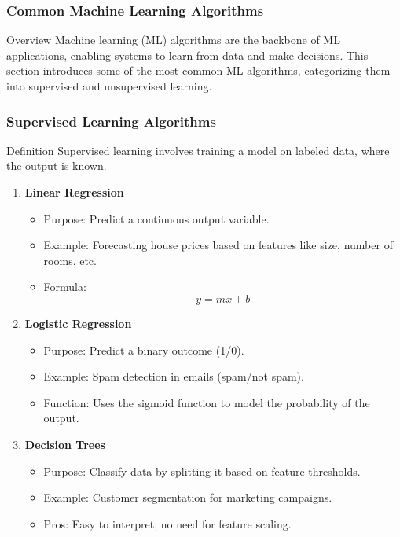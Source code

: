 \documentclass[aspectratio=169]{beamer}
\begin{document}
\begin{frame}[fragile]
    \frametitle{Common Machine Learning Algorithms}
    \begin{block}{Overview}
        Machine learning (ML) algorithms are the backbone of ML applications, enabling systems to learn from data and make decisions. This section introduces some of the most common ML algorithms, categorizing them into supervised and unsupervised learning.
    \end{block}
\end{frame}

\begin{frame}[fragile]
    \frametitle{Supervised Learning Algorithms}
    \begin{block}{Definition}
        Supervised learning involves training a model on labeled data, where the output is known.
    \end{block}
    
    \begin{enumerate}
        \item \textbf{Linear Regression}
        \begin{itemize}
            \item Purpose: Predict a continuous output variable.
            \item Example: Forecasting house prices based on features like size, number of rooms, etc.
            \item Formula: 
            \begin{equation}
                y = mx + b
            \end{equation}
        \end{itemize}
        
        \item \textbf{Logistic Regression}
        \begin{itemize}
            \item Purpose: Predict a binary outcome (1/0).
            \item Example: Spam detection in emails (spam/not spam).
            \item Function: Uses the sigmoid function to model the probability of the output.
        \end{itemize}
        
        \item \textbf{Decision Trees}
        \begin{itemize}
            \item Purpose: Classify data by splitting it based on feature thresholds.
            \item Example: Customer segmentation for marketing campaigns.
            \item Pros: Easy to interpret; no need for feature scaling.
        \end{itemize}
    \end{enumerate}
\end{frame}
\end{document}

